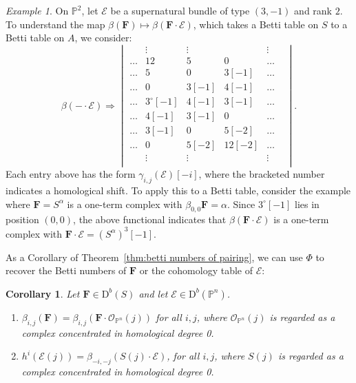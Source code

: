 \documentclass[12pt]{amsart}
\newtheorem{cor}[lemma]{Corollary}
\theoremstyle{definition}
\theoremstyle{remark}
\newtheorem{example}[lemma]{Example}
\newtheorem{remark}[lemma]{Remark}
\newcommand{\kk}{\Bbbk}
\newcommand{\PP}{\mathbb{P}}
\renewcommand{\AA}{\mathbb{A}}
\newcommand{\cO}{\mathcal{O}}
\newcommand{\cE}{\mathcal{E}}
\newcommand{\FF}{\mathbf{F}}
\newcommand{\zp}{\circ}
\newcommand{\DD}{\mathrm{D}}
\renewcommand{\P}{{\mathbb P}}
\begin{document}
\begin{example}\label{ex:sup1}
On $\PP^2$, let $\cE$ be a supernatural bundle of type $(3,-1)$ and rank $2$.  
To understand the map $\beta(\FF)\mapsto \beta(\FF\cdot \cE)$, which takes a Betti table on $S$ to a Betti table on $A$, we consider:
\[
\beta(-\cdot \cE)\Rightarrow
\begin{vmatrix}
&\vdots&\vdots&&\vdots&\\
\dots&12&5&0&\dots\\
\dots&5&0&3[-1]&\dots\\
\dots&0&3[-1]&4[-1]&\dots\\
\dots&3^\zp[-1]&4[-1]&3[-1]&\dots\\
\dots&4[-1]&3[-1]&0&\dots\\
\dots&3[-1]&0&5[-2]&\dots\\
\dots&0&5[-2]&12[-2]&\dots\\
&\vdots&\vdots&&\vdots&\\
\end{vmatrix}.
\]
Each entry above has the form $\gamma_{i,j}(\cE)[-i]$, where the bracketed number indicates a homological shift.  To apply this to a Betti table, consider the example where $\FF=S^\alpha$ is a one-term complex with $\beta_{0,0}\FF=\alpha$.  Since $3^\zp[-1]$ lies in position $(0,0)$, the above functional indicates that $\beta(\FF\cdot \cE)$ is a one-term complex with $\FF\cdot \cE=(S^{\alpha})^3[-1]$.
\end{example}
%

As a Corollary of Theorem~\ref{thm:betti numbers of pairing}, we can use $\Phi$ to recover the Betti numbers of $\FF$  or the cohomology
table of $\cE$:
\begin{cor} Let $\FF\in \DD^b(S)$ and let $\cE\in \DD^b(\PP^n)$.
\begin{enumerate}
\item 
 $\beta_{i,j}(\FF) = \beta_{i,j}(\FF\cdot \cO_{\P^{n}}(j))$ for all $i,j$, where $\cO_{\PP^n}(j)$ is regarded as a complex concentrated in homological degree 0.
\item $h^{i}(\cE(j)) = \beta_{-i,-j}(S(j)\cdot \cE)$, for all $i,j$, where $S(j)$ is regarded as a complex concentrated in homological degree 0.
\end{enumerate}
\end{cor}
\end{document}
